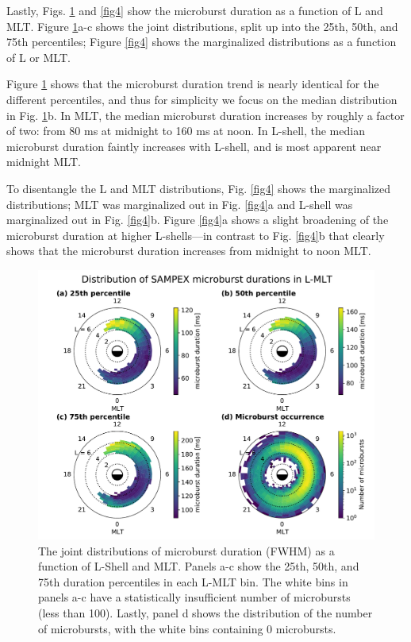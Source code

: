 \documentclass[draft]{agujournal2019}
\begin{document}
Lastly, Figs. \ref{fig3} and \ref{fig4} show the microburst duration as a function of L and MLT. Figure \ref{fig3}a-c shows the joint distributions, split up into the 25th, 50th, and 75th percentiles; Figure \ref{fig4} shows the marginalized distributions as a function of L or MLT.

Figure \ref{fig3} shows that the microburst duration trend is nearly identical for the different percentiles, and thus for simplicity we focus on the median distribution in Fig. \ref{fig3}b. In MLT, the median microburst duration increases by roughly a factor of two: from 80 ms at midnight to 160 ms at noon. In L-shell, the median microburst duration faintly increases with L-shell, and is most apparent near midnight MLT.

To disentangle the L and MLT distributions, Fig. \ref{fig4} shows the marginalized distributions; MLT was marginalized out in Fig. \ref{fig4}a and L-shell was marginalized out in Fig. \ref{fig4}b. Figure \ref{fig4}a shows a slight broadening of the microburst duration at higher L-shells---in contrast to Fig. \ref{fig4}b that clearly shows that the microburst duration increases from midnight to noon MLT.

\begin{figure}
\noindent\includegraphics[width=\textwidth]{figures/fig3.pdf}
\caption{The joint distributions of microburst duration (FWHM) as a function of L-Shell and MLT. Panels a-c show the 25th, 50th, and 75th duration percentiles in each L-MLT bin. The white bins in panels a-c have a statistically insufficient number of microbursts (less than 100). Lastly, panel d shows the distribution of the number of microbursts, with the white bins containing 0 microbursts.}
\label{fig3}
\end{figure}
\end{document}
